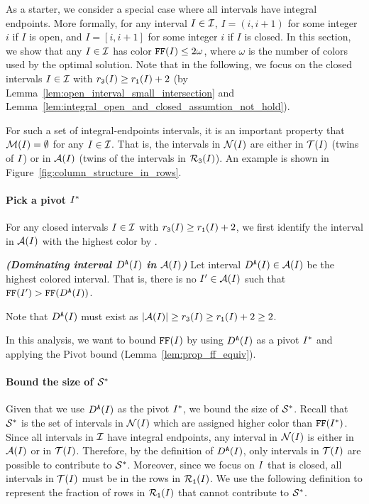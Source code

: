 As a starter, we consider a special case where all intervals have integral endpoints. 
More formally, for any interval $I \in \mathcal{I}$, $I = (i, i+1)$ for some integer $i$ if $I$ is open, and $I = [i, i+1]$ for some integer $i$ if $I$ is closed.
In this section, we show that any $I \in \mathcal{I}$ has color $\text{\texttt{FF}}(I)\leq 2\omega$, where $\omega$ is the number of colors used by the optimal solution.
Note that in the following, we focus on the closed intervals $I \in \mathcal{I}$ with $r_\texttt{3}(I) \geq r_\texttt{1}(I)+2$ (by Lemma~\ref{lem:open_interval_small_intersection} and Lemma~\ref{lem:integral_open_and_closed_assumtion_not_hold}).

For such a set of integral-endpoints intervals, it is an important property that $\mathcal{M}(I) = \emptyset$ for any $I \in \mathcal{I}$.
That is, the intervals in $\mathcal{N}(I)$ are either in $\mathcal{T}(I)$ (twins of $I$) or in $\mathcal{A}(I)$ (twins of the intervals in $\mathcal{R}_\texttt{3}(I)$).
An example is shown in Figure~\ref{fig:column_structure_in_rows}.

\paragraph*{Pick a pivot $I^*$}

For any closed intervals $I \in \mathcal{I}$ with $r_\texttt{3}(I) \geq r_\texttt{1}(I)+2$, we first identify the interval in $\mathcal{A}(I)$ with the highest color by \ff. 

\begin{definition}\emph{\textbf{(Dominating interval $D^\texttt{A}(I)$ in $\mathcal{A}(I)$)}}
    \label{def:y}
    Let interval $D^\texttt{A}(I) \in \mathcal{A}(I)$ be the highest colored interval. That is, there is no $I^\prime \in \mathcal{A}(I)$ such that $\text{\texttt{FF}}(I^\prime) > \text{\texttt{FF}}(D^\texttt{A}(I))$.
\end{definition}

Note that $D^\texttt{A}(I)$ must exist as $|\mathcal{A}(I)| \geq r_\texttt{3}(I) \geq r_\texttt{1}(I) + 2 \geq 2$.

In this analysis, we want to bound $\text{\texttt{FF}}(I)$ by using $D^\texttt{A}(I)$ as a pivot $I^*$ and applying the Pivot bound (Lemma~\ref{lem:prop_ff_equiv}).


\paragraph*{Bound the size of $\mathcal{S}^*$}
Given that we use $D^\texttt{A}(I)$ as the pivot $I^*$, we bound the size of $\mathcal{S}^*$.
Recall that $\mathcal{S}^*$ is the set of intervals in $\mathcal{N}(I)$ which are assigned higher color than $\text{\texttt{FF}}(I^*)$.
Since all intervals in $\mathcal{I}$ have integral endpoints, any interval in $\mathcal{N}(I)$ is either in $\mathcal{A}(I)$ or in $\mathcal{T}(I)$.
Therefore, by the definition of $D^\texttt{A}(I)$, only intervals in $\mathcal{T}(I)$ are possible to contribute to $\mathcal{S}^*$.
Moreover, since we focus on $I$ that is closed, all intervals in $\mathcal{T}(I)$ must be in the rows in $\mathcal{R}_\texttt{1}(I)$. 
We use the following definition to represent the fraction of rows in $\mathcal{R}_\texttt{1}(I)$ that cannot contribute to $\mathcal{S}^*$.



